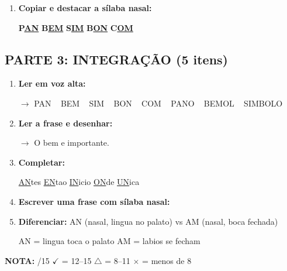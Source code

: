 \begin{exercicio}
\begin{enumerate}[resume]
  \item \textbf{Copiar e destacar a sílaba nasal:}
  \begin{center}
  \textbf{P}\underline{\textbf{AN}} \quad \textbf{B}\underline{\textbf{EM}} \quad \textbf{S}\underline{\textbf{IM}} \quad \textbf{B}\underline{\textbf{ON}} \quad \textbf{C}\underline{\textbf{OM}}
  \end{center}
\end{enumerate}

\subsection*{PARTE 3: INTEGRAÇÃO (5 itens)}

\begin{enumerate}[resume]
  \item \textbf{Ler em voz alta:}
  \begin{center}
  $\rightarrow$ PAN  ~  BEM  ~  SIM  ~  BON  ~  COM  ~  PANO  ~  BEMOL  ~  SIMBOLO
  \end{center}

  \item \textbf{Ler a frase e desenhar:}
  \begin{center}
  $\rightarrow$ O bem e importante.
  \end{center}
  \begin{center}
  \end{center}

  \item \textbf{Completar:}
  \begin{center}
  \underline{AN}tes \quad \underline{EN}tao \quad \underline{IN}icio \quad \underline{ON}de \quad \underline{UN}ica
  \end{center}

  \item \textbf{Escrever uma frase com sílaba nasal:}
  \begin{center}
  \underline{\hspace{12cm}}
  \end{center}

  \item \textbf{Diferenciar:} AN (nasal, lingua no palato) vs AM (nasal, boca fechada)
  \begin{center}
  AN = lingua toca o palato \quad AM = labios se fecham
  \end{center}
\end{enumerate}

\noindent\textbf{NOTA:} \underline{\hspace{1cm}}/15 \quad $\checkmark$ = 12--15 \quad $\triangle$ = 8--11 \quad $\times$ = menos de 8
\end{exercicio}

